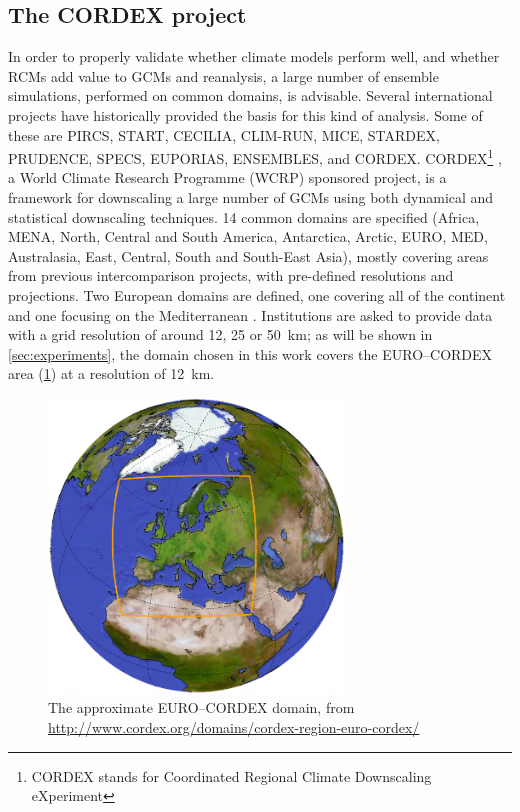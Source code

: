 \subsection{The CORDEX project}\label{sec:cordex}
In order to properly validate whether climate models perform well, and whether RCMs add value to GCMs and reanalysis, a large number of ensemble simulations, performed on common domains, is advisable. Several  international projects have historically provided the basis for this kind of analysis. Some of these are PIRCS, START, CECILIA,
CLIM-RUN, MICE, STARDEX, PRUDENCE, SPECS, EUPORIAS, ENSEMBLES, and CORDEX. CORDEX\footnote{CORDEX stands for Coordinated Regional Climate Downscaling eXperiment} \citep{Giorgi2009, Gutowski2016, Giorgi2015}, a World Climate Research Programme (WCRP) sponsored project, is a framework for downscaling a large number of GCMs using both dynamical and statistical downscaling techniques. 14 common domains are specified (Africa, MENA, North, Central and South America, Antarctica, Arctic, EURO, MED, Australasia, East, Central, South and South-East Asia), mostly covering areas from previous intercomparison projects, with pre-defined resolutions and projections. Two European domains are defined, one covering all of the continent \citep[][EURO--CORDEX]{Jacob2014} and one focusing on the Mediterranean \citep[][Med--CORDEX]{Ruti2016}. Institutions are asked to provide data with a grid resolution of around 12, 25 or \SI{50}{\kilo \meter}; as will be shown in \cref{sec:experiments}, the domain chosen in this work covers the EURO--CORDEX area (\cref{fig:euro_cordex}) at a resolution of \SI{12}{\kilo \meter}.

\begin{figure}
    \centering
    \includegraphics[width=0.7\textwidth]{figures/eurocordex}
    \decoRule
    \caption[EURO--CORDEX domain]{The approximate EURO--CORDEX domain, from \url{http://www.cordex.org/domains/cordex-region-euro-cordex/}} \label{fig:euro_cordex}
\end{figure}

